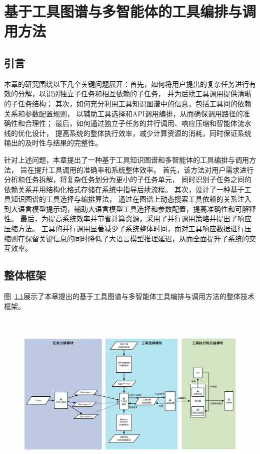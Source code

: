 \chapter{基于工具图谱与多智能体的工具编排与调用方法}

\section{引言}
\label{sec:intro}


本章的研究围绕以下几个关键问题展开：首先，如何将用户提出的复杂任务进行有效的分解，以识别独立子任务和相互依赖的子任务，
并为后续工具调用提供清晰的子任务结构；
其次，如何充分利用工具知识图谱中的信息，包括工具间的依赖关系和参数配置规则，
以辅助工具选择和API调用编排，从而确保调用路径的准确性和合理性；
最后，如何通过独立子任务的并行调用、响应压缩和智能体流水线的优化设计，
提高系统的整体执行效率，减少计算资源的消耗，同时保证系统输出的及时性与结果的完整性。

针对上述问题，本章提出了一种基于工具知识图谱和多智能体的工具编排与调用方法，
旨在提升工具调用的准确率和系统整体效率。
首先，该方法对用户需求进行分析和任务拆解，将复杂任务划分为更小的子任务单元，
同时识别子任务之间的依赖关系并用结构化格式存储在系统中指导后续流程。
其次，设计了一种基于工具知识图谱的工具选择与编排算法，
通过在图谱上动态搜索工具依赖的关系注入到大语言模型提示词，辅助大语言模型工具选择和参数配置，提高准确性和可解释性。
最后，为提高系统效率并节省计算资源，采用了并行调用策略并提出了响应压缩方法。
工具的并行调用显著减少了系统整体时间，而对工具响应数据进行压缩则在保留关键信息的同时降低了大语言模型推理延迟，从而全面提升了系统的交互效率。

\section{整体框架}

图~\ref{fig:ch4-framework}展示了本章提出的基于工具图谱与多智能体工具编排与调用方法的整体技术框架。

\begin{figure}[!htp]
  \vspace{1em}
  \centering
  \setlength{\abovecaptionskip}{10pt} %
  \includegraphics[height=8cm]{../assets/ch4-整体框架图-3.pdf}
  \label{fig:ch4-framework}
\end{figure}

